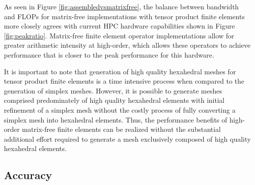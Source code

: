As seen in Figure \ref{fig:assembledvsmatrixfree}, the balance between bandwidth and FLOPs for matrix-free implementations with tensor product finite elements more closely agrees with current HPC hardware capabilities shown in Figure \ref{fig:peakratio}.
Matrix-free finite element operator implementations allow for greater arithmetic intensity at high-order, which allows these operators to achieve performance that is closer to the peak performance for this hardware.

It is important to note that generation of high quality hexahedral meshes for tensor product finite elements is a time intensive process when compared to the generation of simplex meshes.
However, it is possible to generate meshes comprised predominately of high quality hexahedral elements with initial refinement of a simplex mesh without the costly process of fully converting a simplex mesh into hexahedral elements.
Thus, the performance benefits of high-order matrix-free finite elements can be realized without the substantial additional effort required to generate a mesh exclusively composed of high quality hexahedral elements.

\subsection{Accuracy}
